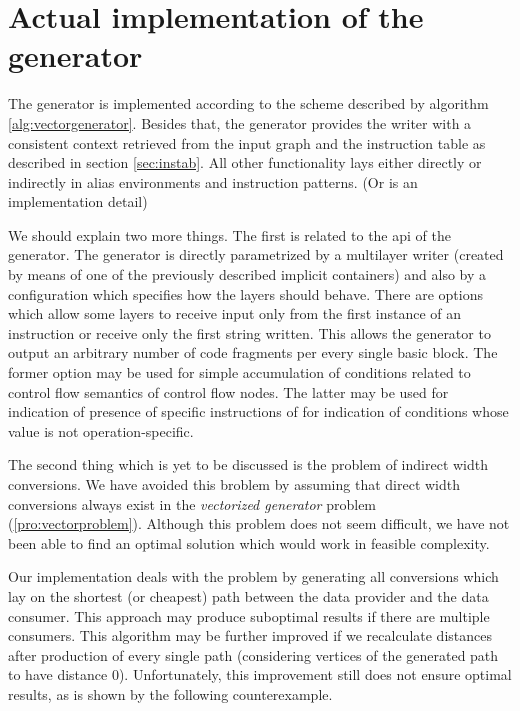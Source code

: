 \section{Actual implementation of the generator}

The generator is implemented according to the scheme described by algorithm \ref{alg:vectorgenerator}. Besides that, the generator provides the writer with a consistent context retrieved from the input graph and the instruction table as described in section \ref{sec:instab}. All other functionality lays either directly or indirectly in alias environments and instruction patterns. (Or is an implementation detail)

We should explain two more things. The first is related to the api of the generator. The generator is directly parametrized by a multilayer writer (created by means of one of the previously described implicit containers) and also by a configuration which specifies how the layers should behave. There are options which allow some layers to receive input only from the first instance of an instruction or receive only the first string written. This allows the generator to output an arbitrary number of code fragments per every single basic block. The former option may be used for simple accumulation of conditions related to control flow semantics of control flow nodes. The latter may be used for indication of presence of specific instructions of for indication of conditions whose value is not operation-specific.

The second thing which is yet to be discussed is the problem of indirect width conversions. We have avoided this broblem by assuming that direct width conversions always exist in the \emph{vectorized generator} problem (\ref{pro:vectorproblem}).  Although this problem does not seem difficult, we have not been able to find an optimal solution which would work in feasible complexity. 

Our implementation deals with the problem by generating all conversions which lay on the shortest (or cheapest) path between the data provider and the data consumer. This approach may produce suboptimal results if there are multiple consumers. This algorithm may be further improved if we recalculate distances after production of every single path (considering vertices of the generated path to have distance 0). Unfortunately, this improvement still does not ensure optimal results, as is shown by the following counterexample.


